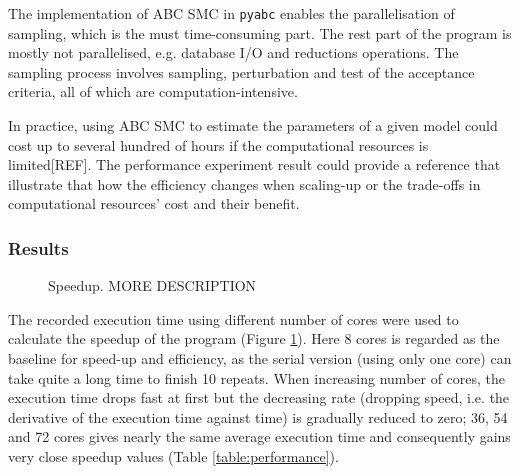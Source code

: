 The implementation of ABC SMC in \verb|pyabc| enables the parallelisation of sampling, which is the must time-consuming part. The rest part of the program is mostly not parallelised, e.g. database I/O and reductions operations. The sampling process involves sampling, perturbation and test of the acceptance criteria, all of which are computation-intensive.

In practice, using ABC SMC to estimate the parameters of a given model could cost up to several hundred of hours if the computational resources is limited[REF]. The performance experiment result could provide a reference that illustrate that how the efficiency changes when scaling-up or the trade-offs in computational resources' cost and their benefit.

\subsubsection{Results}




\begin{figure}[h]
    \begin{center}
    \end{center}

    \caption[TODO]{Speedup. MORE DESCRIPTION}
    \label{fig:speedup}
\end{figure}

The recorded execution time using different number of cores were used to calculate the speedup of the program (Figure \ref{fig:speedup}). Here 8 cores is regarded as the baseline for speed-up and efficiency, as the serial version (using only one core) can take quite a long time to finish 10 repeats. When increasing number of cores, the execution time drops fast at first but the decreasing rate (dropping speed, i.e. the derivative of the execution time against time) is gradually reduced to zero; 36, 54 and 72 cores gives nearly the same average execution time and consequently gains very close speedup values (Table \ref{table:performance}).

